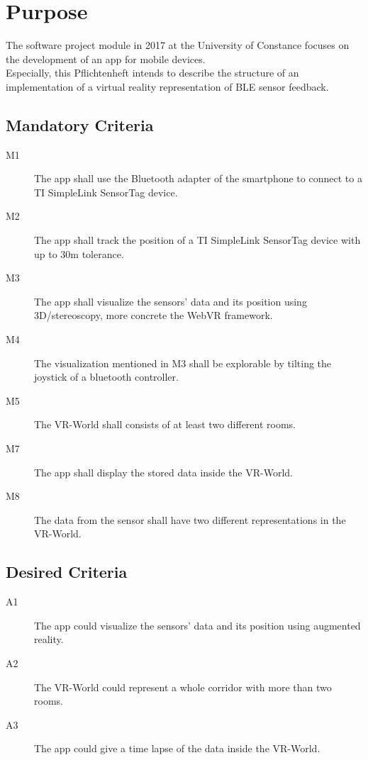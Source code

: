 \section{Purpose}
The software project module in 2017 at the University of Constance focuses on the development of an app for mobile devices. \\
Especially, this Pflichtenheft intends to describe the structure of an implementation of a virtual reality representation of BLE sensor feedback.

\subsection{Mandatory Criteria}

\begin{description}
  \item[M1] The app shall use the Bluetooth adapter of the smartphone to connect to a TI SimpleLink SensorTag device.
  \item[M2] The app shall track the position of a TI SimpleLink SensorTag device with up to 30m tolerance.
  \item[M3] The app shall visualize the sensors' data and its position using 3D/stereoscopy, more concrete the WebVR framework.
  \item[M4] The visualization mentioned in M3 shall be explorable by tilting the joystick of a bluetooth controller.
  \item[M5] The VR-World shall consists of at least two different rooms.
  \item[M7] The app shall display the stored data inside the VR-World.
  \item[M8] The data from the sensor shall have two different representations in the VR-World.
\end{description}

\subsection{Desired Criteria}

\begin{description}
  \item[A1] The app could visualize the sensors' data and its position using augmented reality.
  \item[A2] The VR-World could represent a whole corridor with more than two rooms.
  \item[A3] The app could give a time lapse of the data inside the VR-World.
\end{description}

